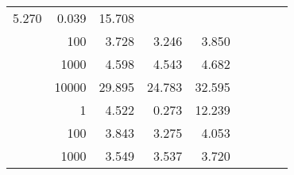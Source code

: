 \begin{table}
\begin{tabular}{rrrrrrrrr}
						
							    
							    
	                           5.270 & 0.039 & 15.708  \\
	                
	            
					 &  
					 
					\multirow{ 1 }{*}{ 100 } &
					
						
							    
							    
	                           3.728 & 3.246 & 3.850  \\
	                
	            
					 &  
					 
					\multirow{ 1 }{*}{ 1000 } &
					
						
							    
							    
	                           4.598 & 4.543 & 4.682  \\
	                
	            
					 &  
					 
					\multirow{ 1 }{*}{ 10000 } &
					
						
							    
							    
	                           29.895 & 24.783 & 32.595  \\
	                
	            
	        
				\noalign{\smallskip}\hline
				\multirow{ 4 }{*}{ 1000000 } &
				
					
					 
					\multirow{ 1 }{*}{ 1 } &
					
						
							    
							    
	                           4.522 & 0.273 & 12.239  \\
	                
	            
					 &  
					 
					\multirow{ 1 }{*}{ 100 } &
					
						
							    
							    
	                           3.843 & 3.275 & 4.053  \\
	                
	            
					 &  
					 
					\multirow{ 1 }{*}{ 1000 } &
					
						
							    
							    
	                           3.549 & 3.537 & 3.720  \\
	                

\end{tabular}
\end{table}
